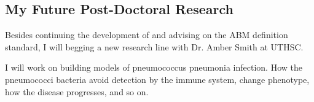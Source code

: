 
\subsection{My Future Post-Doctoral Research}
Besides continuing the development of \pcps and advising on the ABM definition standard, I will begging a new research line with Dr. Amber Smith at UTHSC. 

I will work on building models of pneumococcus pneumonia infection. How the pneumococci bacteria avoid detection by the immune system, change phenotype, how the disease progresses, and so on. 


